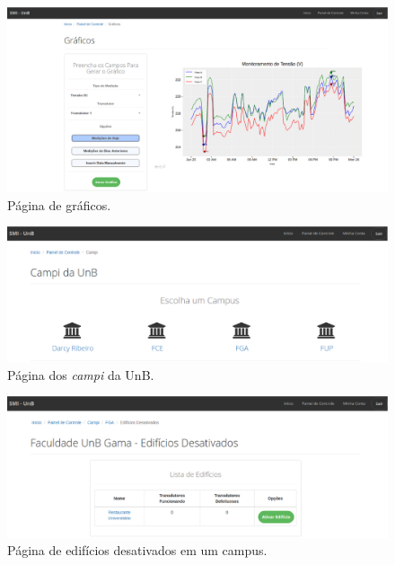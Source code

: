 \begin{apendicesenv}
\begin{figure}[!htpb]
    \centering
    \includegraphics[keepaspectratio=true,scale=0.35]{figuras/img15.eps}
    \caption{Página de gráficos.}
    \label{img15}
\end{figure}

\begin{figure}[!htpb]
    \centering
    \includegraphics[keepaspectratio=true,scale=0.35]{figuras/img7.eps}
    \caption{Página dos \textit{campi} da UnB.}
    \label{img7}
\end{figure}

\begin{figure}[!htpb]
    \centering
    \includegraphics[keepaspectratio=true,scale=0.35]{figuras/img8.eps}
    \caption{Página de edifícios desativados em um campus.}
    \label{img8}
\end{figure}


\end{apendicesenv}

